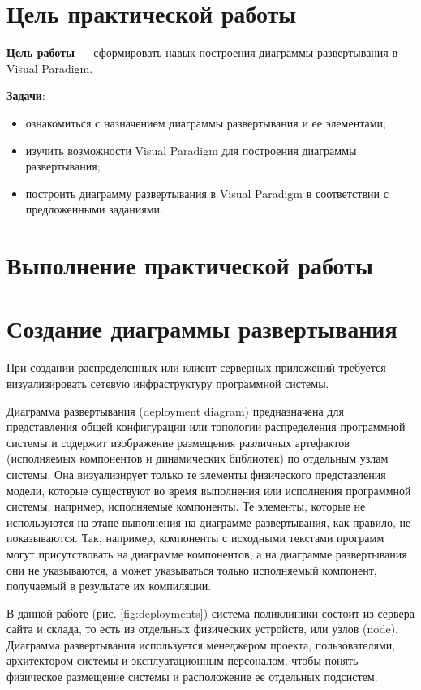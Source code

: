 \graphicspath{{./seventh/img/}} %

\section*{\LARGE Цель практической работы}

\textbf{Цель работы} --- сформировать навык построения диаграммы
развертывания в Visual Paradigm.

\textbf{Задачи}:
\begin{itemize}
	\item ознакомиться с назначением диаграммы развертывания и ее
		элементами;
	\item изучить возможности Visual Paradigm для построения
		диаграммы развертывания;
	\item построить диаграмму развертывания в Visual Paradigm в
		соответствии с предложенными заданиями.
\end{itemize}

\clearpage

\section*{\LARGE Выполнение практической работы}
\section{Создание диаграммы развертывания}
При создании распределенных или клиент-серверных приложений
требуется визуализировать сетевую инфраструктуру программной системы.\par
Диаграмма развертывания (deployment diagram) предназначена для
представления общей конфигурации или топологии распределения
программной системы и содержит изображение размещения различных
артефактов (исполняемых компонентов и динамических библиотек) по
отдельным узлам системы. Она визуализирует только те элементы физического
представления модели, которые существуют во время выполнения или
исполнения программной системы, например, исполняемые компоненты. Те
элементы, которые не используются на этапе выполнения на диаграмме
развертывания, как правило, не показываются. Так, например, компоненты с
исходными текстами программ могут присутствовать на диаграмме
компонентов, а на диаграмме развертывания они не указываются, а может
указываться только исполняемый компонент, получаемый в результате их
компиляции.\par
В данной работе (рис. \ref{fig:deployments}) система поликлиники состоит
из сервера сайта и склада, то есть из отдельных физических устройств,
или узлов (node).
Диаграмма развертывания используется менеджером проекта, пользователями,
архитектором системы и эксплуатационным персоналом, чтобы понять
физическое размещение системы и расположение ее отдельных подсистем.

